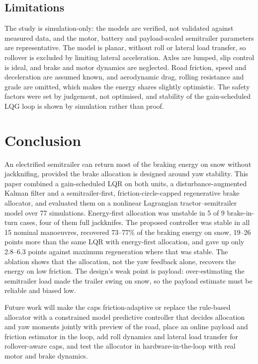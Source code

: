 \documentclass[conference]{IEEEtran}
\begin{document}
\subsection{Limitations}
The study is simulation-only: the models are verified, not validated against measured data, and the motor, battery and payload-scaled semitrailer parameters are representative. The model is planar, without roll or lateral load transfer, so rollover is excluded by limiting lateral acceleration. Axles are lumped, slip control is ideal, and brake and motor dynamics are neglected. Road friction, speed and deceleration are assumed known, and aerodynamic drag, rolling resistance and grade are omitted, which makes the energy shares slightly optimistic. The safety factors were set by judgement, not optimised, and stability of the gain-scheduled LQG loop is shown by simulation rather than proof.

\section{Conclusion}
An electrified semitrailer can return most of the braking energy on snow without jackknifing, provided the brake allocation is designed around yaw stability. This paper combined a gain-scheduled LQR on both units, a disturbance-augmented Kalman filter and a semitrailer-first, friction-circle-capped regenerative brake allocator, and evaluated them on a nonlinear Lagrangian tractor--semitrailer model over 77 simulations. Energy-first allocation was unstable in 5 of 9 brake-in-turn cases, four of them full jackknifes. The proposed controller was stable in all 15 nominal manoeuvres, recovered 73--77\% of the braking energy on snow, 19--26 points more than the same LQR with energy-first allocation, and gave up only 2.8--6.3 points against maximum regeneration where that was stable. The ablation shows that the allocation, not the yaw feedback alone, recovers the energy on low friction. The design's weak point is payload: over-estimating the semitrailer load made the trailer swing on snow, so the payload estimate must be reliable and biased low.

Future work will make the caps friction-adaptive or replace the rule-based allocator with a constrained model predictive controller that decides allocation and yaw moments jointly with preview of the road, place an online payload and friction estimator in the loop, add roll dynamics and lateral load transfer for rollover-aware caps, and test the allocator in hardware-in-the-loop with real motor and brake dynamics.
\end{document}
